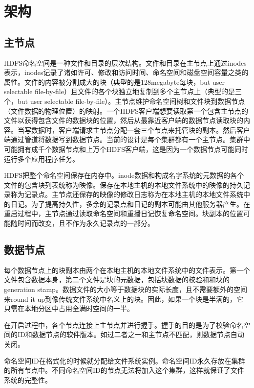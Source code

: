 \section{架构}

\subsection{主节点}

HDFS命名空间是一种文件和目录的层次结构。文件和目录在主节点上通过inodes表示，inodes记录了诸如许可、修改和访问时间、命名空间和磁盘空间容量之类的属性。文件的内容被分割成大的块（典型的是128megabyte每块，but
user selectable file-by-file）且文件的各个块独立地复制到多个主节点上（典型的是三个，but user selectable file-by-file）。主节点维护命名空间树和文件块到数据节点（文件数据的物理位置）的映射。一个HDFS客户端想要读取第一个包含主节点的文件以获得包含文件的数据块的位置，然后从最靠近客户端的数据节点读取块的内容。当写数据时，客户端请求主节点分配一套三个节点来托管块的副本。然后客户端通过管道将数据写到数据节点。当前的设计是每个集群都有一个主节点。集群中可能拥有成千个数据节点和上万个HDFS客户端，这是因为一个数据节点可能同时运行多个应用程序任务。

HDFS把整个命名空间保存在内存中。inode数据和构成名字系统的元数据的各个文件的包含块列表统称为映像。保存在本地主机的本地文件系统中的映像的持久记录称为记录点。主节点还保存的映像的修改日志称为在本地主机的本地文件系统中的日记。为了提高持久性，多余的记录点和日记的副本可能由其他服务器产生。在重启过程中，主节点通过读取命名空间和重播日记恢复命名空间。块副本的位置可能随时间而改变，且不作为永久记录点的一部分。

\subsection{数据节点}

每个数据节点上的块副本由两个在本地主机的本地文件系统中的文件表示。第一个文件包含数据本身，第二个文件是块的元数据，包括块数据的校验和和块的generation stamp。数据文件的大小等于数据块的实际长度，且不需要额外的空间来round it up到像传统文件系统中名义上的块。因此，如果一个块是半满的，它只需在本地分区中占用全满时空间的一半。

在开启过程中，各个节点连接上主节点并进行握手。握手的目的是为了校验命名空间的ID和数据节点的软件版本。如过二者之一和主节点不匹配，则数据节点自动关闭。

命名空间ID在格式化的时候就分配给文件系统实例。命名空间ID永久存放在集群的所有节点中。不同命名空间ID的节点无法将加入这个集群，这样就保证了文件系统的完整性。

